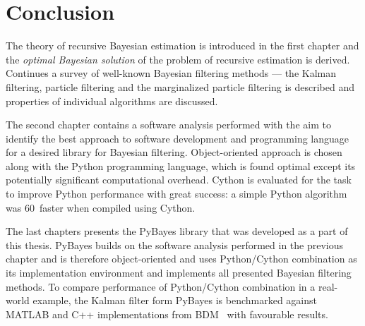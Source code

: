 \clearpage %
\chapter*{Conclusion}
\vspace{-3mm} %
The theory of recursive Bayesian estimation is introduced in the first chapter and the \emph{optimal
Bayesian solution} of the problem of recursive estimation is derived. Continues a survey of
well-known Bayesian filtering methods --- the Kalman filtering, particle filtering and the
marginalized particle filtering is described and properties of individual algorithms are discussed.

The second chapter contains a software analysis performed with the aim to identify the best
approach to software development and programming language for a desired library for Bayesian
filtering. Object-oriented approach is chosen along with the Python programming language, which is
found optimal except its potentially significant computational overhead. Cython is evaluated for the
task to improve Python performance with great success: a simple Python algorithm was 60\x\ faster
when compiled using Cython.

The last chapters presents the PyBayes library that was developed as a part of this thesis. PyBayes
builds on the software analysis performed in the previous chapter and is therefore object-oriented
and uses Python/Cython combination as its implementation environment and implements all presented
Bayesian filtering methods. To compare performance of Python/Cython combination in a real-world
example, the Kalman filter form PyBayes is benchmarked against MATLAB and C++ implementations from
BDM~\cite{BDM} with favourable results.

